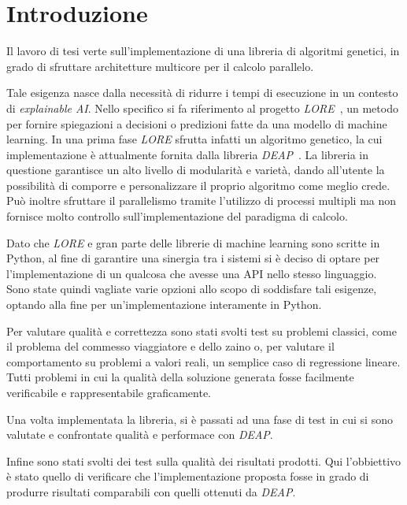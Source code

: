 \chapter*{Introduzione}

Il lavoro di tesi verte sull'implementazione di una libreria di algoritmi
genetici, in grado di sfruttare architetture multicore per il calcolo parallelo.

Tale esigenza nasce dalla necessità di ridurre i tempi di esecuzione in un
contesto di \textit{explainable AI}. Nello specifico si fa riferimento al
progetto \textit{LORE}~\cite{DBLP:journals/corr/abs-1805-10820}, un metodo per
fornire spiegazioni a decisioni o predizioni fatte da una modello di machine
learning. In una prima fase \textit{LORE} sfrutta infatti un algoritmo genetico,
la cui implementazione è attualmente fornita dalla libreria
\textit{DEAP}~\cite{DEAP_JMLR2012}. La libreria in questione garantisce un alto
livello di modularità e varietà, dando all'utente la possibilità di comporre e
personalizzare il proprio algoritmo come meglio crede. Può inoltre sfruttare il
parallelismo tramite l'utilizzo di processi multipli ma non fornisce molto
controllo sull'implementazione del paradigma di calcolo.

Dato che \textit{LORE} e gran parte delle librerie di machine learning sono
scritte in Python, al fine di garantire una sinergia tra i sistemi si è deciso
di optare per l'implementazione di un qualcosa che avesse una API nello stesso
linguaggio. Sono state quindi vagliate varie opzioni allo scopo di soddisfare
tali esigenze, optando alla fine per un'implementazione interamente in Python.

Per valutare qualità e correttezza sono stati svolti test su problemi classici,
come il problema del commesso viaggiatore e dello zaino o, per valutare il
comportamento su problemi a valori reali, un semplice caso di regressione
lineare. Tutti problemi in cui la qualità della soluzione generata fosse
facilmente verificabile e rappresentabile graficamente.

Una volta implementata la libreria, si è passati ad una fase di test in cui
si sono valutate e confrontate qualità e performace con \textit{DEAP}.

Infine sono stati svolti dei test sulla qualità dei risultati prodotti. Qui
l'obbiettivo è stato quello di verificare che l'implementazione proposta fosse
in grado di produrre risultati comparabili con quelli ottenuti da \textit{DEAP}.